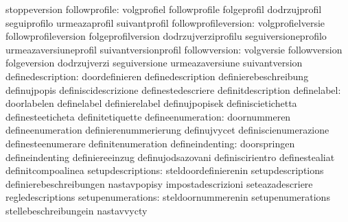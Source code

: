                                   stoppeversion
                   followprofile: volgprofiel                      followprofile
                                  folgeprofil                      dodrzujprofil
                                  seguiprofilo                     urmeazaprofil
                                  suivantprofil
            followprofileversion: volgprofielversie                followprofileversion
                                  folgeprofilversion               dodrzujverziprofilu
                                  seguiversioneprofilo             urmeazaversiuneprofil
                                  suivantversionprofil
                   followversion: volgversie                       followversion
                                  folgeversion                     dodrzujverzi
                                  seguiversione                    urmeazaversiune
                                  suivantversion
               definedescription: doordefinieren                   definedescription
                                  definierebeschreibung            definujpopis
                                  definiscidescrizione             definestedescriere
                                  definitdescription
                     definelabel: doorlabelen                      definelabel
                                  definierelabel                   definujpopisek
                                  definiscietichetta               definesteeticheta
                                  definitetiquette
               defineenumeration: doornummeren                     defineenumeration
                                  definierenummerierung            definujvycet
                                  definiscienumerazione            definesteenumerare
                                  definitenumeration
                 defineindenting: doorspringen                     defineindenting
                                  definiereeinzug                  definujodsazovani
                                  definiscirientro                 definestealiat
                                  definitcompoalinea
               setupdescriptions: steldoordefinierenin             setupdescriptions
                                  definierebeschreibungen          nastavpopisy
                                  impostadescrizioni               seteazadescriere
                                  regledescriptions
               setupenumerations: steldoornummerenin               setupenumerations
                                  stellebeschreibungein            nastavvycty
